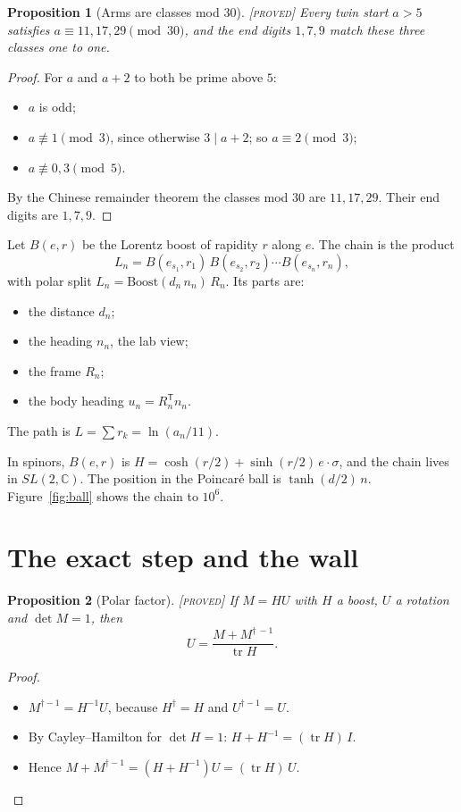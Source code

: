 \documentclass[11pt]{article}
\newtheorem{proposition}{Proposition}
\theoremstyle{definition}
\theoremstyle{remark}
\newcommand{\grade}[1]{\textsc{[#1]}}
\begin{document}
\begin{proposition}[Arms are classes mod 30] \grade{proved}
Every twin start $a>5$ satisfies $a\equiv 11,17,29\pmod{30}$, and the end digits $1,7,9$ match these three classes one to one.
\end{proposition}
\begin{proof}
For $a$ and $a+2$ to both be prime above $5$:
\begin{itemize}
\item $a$ is odd;
\item $a\not\equiv 1\pmod 3$, since otherwise $3\mid a+2$; so $a\equiv 2\pmod3$;
\item $a\not\equiv 0,3\pmod 5$.
\end{itemize}
By the Chinese remainder theorem the classes mod 30 are $11,17,29$. Their end digits are $1,7,9$.
\end{proof}

Let $B(e,r)$ be the Lorentz boost of rapidity $r$ along $e$. The chain is the product
\[
L_n=B(e_{s_1},r_1)\,B(e_{s_2},r_2)\cdots B(e_{s_n},r_n),
\]
with polar split $L_n=\mathrm{Boost}(d_n\,n_n)\,R_n$. Its parts are:
\begin{itemize}
\item the distance $d_n$;
\item the heading $n_n$, the lab view;
\item the frame $R_n$;
\item the body heading $u_n=R_n^{\mathsf T}n_n$.
\end{itemize}
The path is $L=\sum r_k=\ln(a_n/11)$.

In spinors, $B(e,r)$ is $H=\cosh(r/2)+\sinh(r/2)\,e\cdot\sigma$, and the chain lives in $SL(2,\mathbb C)$. The position in the Poincar\'e ball is $\tanh(d/2)\,n$. Figure~\ref{fig:ball} shows the chain to $10^6$.

\section{The exact step and the wall}

\begin{proposition}[Polar factor] \grade{proved}
If $M=HU$ with $H$ a boost, $U$ a rotation and $\det M=1$, then
\[
U=\frac{M+M^{\dagger\,-1}}{\operatorname{tr}H}.
\]
\end{proposition}
\begin{proof}
\begin{itemize}
\item $M^{\dagger-1}=H^{-1}U$, because $H^\dagger=H$ and $U^{\dagger-1}=U$.
\item By Cayley--Hamilton for $\det H=1$: $H+H^{-1}=(\operatorname{tr}H)\,I$.
\item Hence $M+M^{\dagger-1}=(H+H^{-1})U=(\operatorname{tr}H)\,U$.
\end{itemize}
\end{proof}
\end{document}
